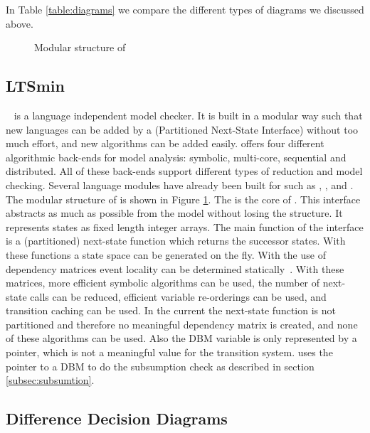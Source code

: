 In Table \ref{table:diagrams} we compare the different types of diagrams we discussed above.

\begin{figure}[h] 

\caption{Modular structure of \ltsmin{}}
\label{fig:pins_modern}
\end{figure}

\subsection{LTSmin}
\ltsmin{}~\cite{eemcs18152,ltsmin-mc:nmf2011} is a language independent model checker. It is built in a modular way such that new languages can be added by a \pins{} (Partitioned Next-State Interface) without too much effort, and new algorithms can be added easily. \ltsmin{} offers four different algorithmic back-ends for model analysis: symbolic, multi-core, sequential and distributed. All of these back-ends support different types of reduction and model checking. Several language modules have already been built for \ltsmin{} such as \mcrl{}, \promela{}, \dve{} and \uppaal{}. The modular structure of \ltsmin{} is shown in Figure \ref{fig:pins_modern}. The \pins{} is the core of \ltsmin{}. This interface abstracts as much as possible from the model without losing the structure. It represents states as fixed length integer arrays. The main function of the interface is a (partitioned) next-state function which returns the successor states. With these functions a state space can be generated on the fly. With the use of dependency matrices event locality can be determined statically~\cite{rwcmatrices}. With these matrices, more efficient symbolic algorithms can be used, the number of next-state calls can be reduced, efficient variable re-orderings can be used, and transition caching can be used. In the current \uppaal{} \pins{} the next-state function is not partitioned and therefore no meaningful dependency matrix is created, and none of these algorithms can be used. Also the DBM variable is only represented by a pointer, which is not a meaningful value for the transition system. \ltsmin{} uses the pointer to a DBM to do the subsumption check as described in section \ref{subsec:subsumtion}.

\subsection{Difference Decision Diagrams}

